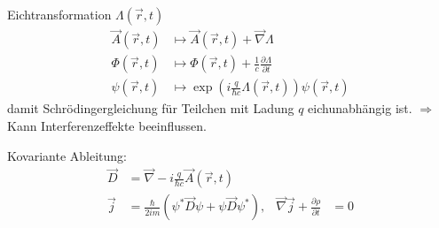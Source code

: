 Eichtransformation $\Lambda (\vec{r}, t)$
	\begin{align*}
		\vec{A} (\vec{r}, t) &\mapsto \vec{A} (\vec{r}, t) + \vec{\nabla} \Lambda \\
		\Phi (\vec{r}, t) &\mapsto \Phi (\vec{r}, t) + \frac{1}{c} \frac{\partial \Lambda}{\partial t} \\
		\psi (\vec{r}, t) &\mapsto \exp \left(i \frac{q}{\hbar c} \Lambda (\vec{r}, t)\right)
		\psi (\vec{r}, t)
	\end{align*}
damit Schrödingergleichung für Teilchen mit Ladung $q$ eichunabhängig ist.
$\Rightarrow$ Kann Interferenzeffekte beeinflussen.

Kovariante Ableitung:
	\begin{align*}
		\vec{D} &= \vec{\nabla} - i\frac{q}{\hbar c} \vec{A} (\vec{r},t) \\
		\vec{j} &= \frac{\hbar}{2 i m} \left(
			\psi^* \vec{D} \psi + \psi \vec{D} \psi^*
		\right),&
		\vec{\nabla} \vec{j} + \frac{\partial \rho}{\partial t} &= 0
	\end{align*}

